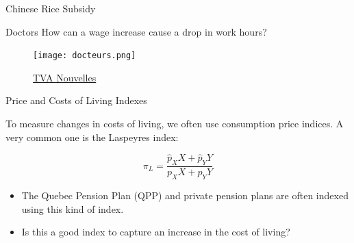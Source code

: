 \documentclass[handout]{beamer}
\begin{document}
\begin{frame}{Chinese Rice Subsidy}

\begin{figure}
\end{figure}

\end{frame}

\begin{frame}{Doctors}
How can a wage increase cause a drop in work hours?
\begin{figure}
\centering
\texttt{[image: docteurs.png]}
\caption{\href{https://www.tvanouvelles.ca/2018/05/17/medecins-de-familles-la-moitie-travaillent-4-jours-et-moins}{TVA Nouvelles}}
\end{figure}
\end{frame}

\begin{frame}{Price and Costs of Living Indexes}

To measure changes in costs of living, we often use consumption price indices. A very common one is the Laspeyres index: 

$$ \pi_L = \frac{\hat p_X X + \hat p_Y Y}{p_X X + p_Y Y} $$

\begin{itemize}
\item The Quebec Pension Plan (QPP) and private pension plans are often indexed using this kind of index.
\item Is this a good index to capture an increase in the cost of living?

\end{itemize}

\end{frame}
\end{document}

